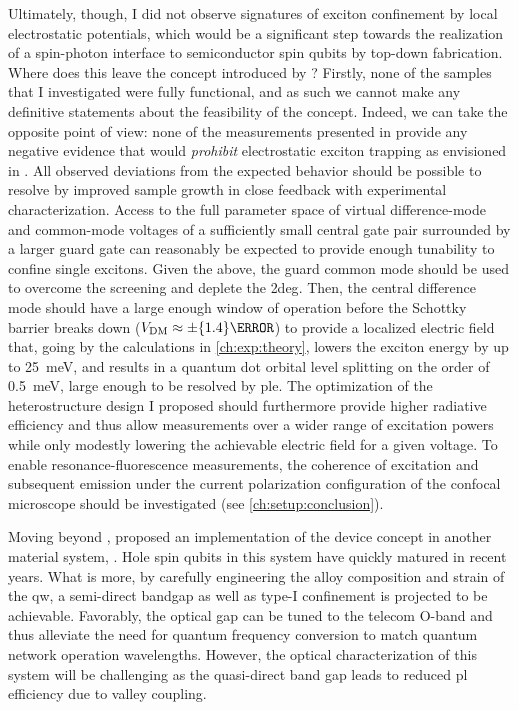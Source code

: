 Ultimately, though, I did not observe signatures of exciton confinement by local electrostatic potentials, which would be a significant step towards the realization of a spin-photon interface to semiconductor spin qubits by top-down fabrication.
Where does this leave the concept introduced by \textcite{Descamps2021}?
Firstly, none of the samples that I investigated were fully functional, and as such we cannot make any definitive statements about the feasibility of the concept.
Indeed, we can take the opposite point of view: none of the measurements presented in \thethesis provide any negative evidence that would \emph{prohibit} electrostatic exciton trapping as envisioned in .
All observed deviations from the expected behavior should be possible to resolve by improved sample growth in close feedback with experimental characterization.
Access to the full parameter space of virtual difference-mode and common-mode voltages of a sufficiently small central gate pair surrounded by a larger guard gate can reasonably be expected to provide enough tunability to confine single excitons.
Given the above, the guard common mode should be used to overcome the screening and deplete the \gls{2deg}.
Then, the central difference mode should have a large enough window of operation before the Schottky barrier breaks down ($\VDM\approx\pm\qty{1.4}{\volt}$) to provide a localized electric field that, going by the calculations in \cref{ch:exp:theory}, lowers the exciton energy by up to \qty{25}{\milli\electronvolt}, and results in a quantum dot orbital level splitting on the order of \qty{0.5}{\milli\electronvolt}, large enough to be resolved by \gls{ple}.
The optimization of the heterostructure design I proposed should furthermore provide higher radiative efficiency and thus allow measurements over a wider range of excitation powers while only modestly lowering the achievable electric field for a given voltage.
To enable resonance-fluorescence measurements, the coherence of excitation and subsequent emission under the current polarization configuration of the confocal microscope should be investigated (see \cref{ch:setup:conclusion}).

Moving beyond , \textcite{Reznikov2024} proposed an implementation of the device concept in another material system, .
Hole spin qubits in this system have quickly matured in recent years.
What is more, by carefully engineering the alloy composition and strain of the \gls{qw}, a semi-direct
bandgap as well as type-I confinement
is projected to be achievable.
Favorably, the optical gap can be tuned to the telecom O-band and thus alleviate the need for quantum frequency conversion to match quantum network operation wavelengths.
However, the optical characterization of this system will be challenging as the quasi-direct band gap leads to reduced \gls{pl} efficiency due to valley coupling.